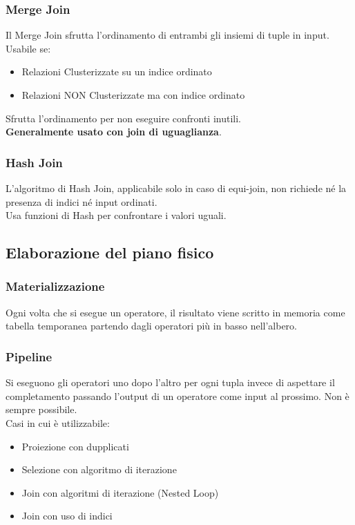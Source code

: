 \subsubsection{Merge Join}
Il Merge Join sfrutta l'ordinamento di entrambi gli insiemi di tuple in input.\\
Usabile se:
\begin{itemize}
    \item Relazioni Clusterizzate su un indice ordinato
    \item Relazioni NON Clusterizzate ma con indice ordinato
\end{itemize}
Sfrutta l'ordinamento per non eseguire confronti inutili.\\
\textbf{Generalmente usato con join di uguaglianza}.

\subsubsection{Hash Join}
L’algoritmo di Hash Join, applicabile solo in caso di equi-join, non richiede né la presenza di indici né input ordinati.\\
Usa funzioni di Hash per confrontare i valori uguali.

\subsection{Elaborazione del piano fisico}
\subsubsection{Materializzazione}
Ogni volta che si esegue un operatore, il risultato viene scritto in memoria come tabella temporanea partendo dagli operatori più in basso nell'albero.

\subsubsection{Pipeline}
Si eseguono gli operatori uno dopo l'altro per ogni tupla invece di aspettare il completamento passando l'output di un operatore come input al prossimo. Non \`e sempre possibile.\\
Casi in cui \`e utilizzabile:
\begin{itemize}
    \item Proiezione con dupplicati
    \item Selezione con algoritmo di iterazione
    \item Join con algoritmi di iterazione (Nested Loop)
    \item Join con uso di indici
\end{itemize}

